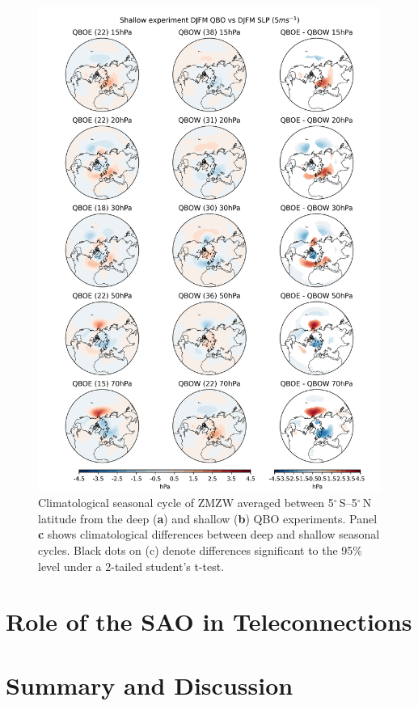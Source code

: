 \begin{figure}[h!]
\begin{center}
\noindent\includegraphics[width = \linewidth]{Figures/Figures-deepQBO/SLP_composites_QBO_phases_s_DJFMQBO_vs_DJFM_70hPa_5thresh.png}
\caption[Climatological seasonal cycle of equatorial ZMZW in QBO experiments]{Climatological seasonal cycle of ZMZW averaged between 5$^{\circ}$\,S--5$^{\circ}$\,N latitude from the deep (\textbf{a}) and shallow (\textbf{b}) QBO experiments. Panel \textbf{c} shows climatological differences between deep and shallow seasonal cycles. Black dots on (c) denote differences significant to the 95\% level under a 2-tailed student's t-test.}
\label{fig:experiment_SAOs}
\end{center}
\end{figure}



\section{Role of the SAO in Teleconnections}


\section{Summary and Discussion}


